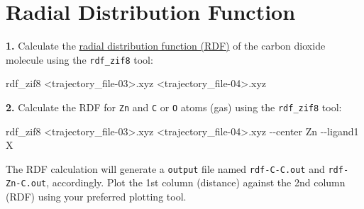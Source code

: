 \documentclass[
  letterpaper,
  DIV=11,
  numbers=noendperiod]{scrreprt}
\newenvironment{Shaded}{\begin{snugshade}}{\end{snugshade}}
\newcommand{\AttributeTok}[1]{\textcolor[rgb]{0.40,0.45,0.13}{#1}}
\newcommand{\ExtensionTok}[1]{\textcolor[rgb]{0.00,0.23,0.31}{#1}}
\newcommand{\NormalTok}[1]{\textcolor[rgb]{0.00,0.23,0.31}{#1}}
\newcommand{\OperatorTok}[1]{\textcolor[rgb]{0.37,0.37,0.37}{#1}}
\begin{document}
\hypertarget{radial-distribution-function}{%
\section*{Radial Distribution
Function}\label{radial-distribution-function}}


\textbf{1.} Calculate the
\protect\hyperlink{radial-distribution-functions-ux28rdfsux29}{radial
distribution function (RDF)} of the carbon dioxide molecule using the
\texttt{rdf\_zif8} tool:

\begin{Shaded}
\begin{Highlighting}[]
\ExtensionTok{rdf\_zif8} \OperatorTok{\textless{}}\NormalTok{trajectory\_file{-}03}\OperatorTok{\textgreater{}}\NormalTok{.xyz }\OperatorTok{\textless{}}\NormalTok{trajectory\_file{-}04}\OperatorTok{\textgreater{}}\NormalTok{.xyz}
\end{Highlighting}
\end{Shaded}

\textbf{2.} Calculate the RDF for \texttt{Zn} and \texttt{C} or
\texttt{O} atoms (gas) using the \texttt{rdf\_zif8} tool:

\begin{Shaded}
\begin{Highlighting}[]
\ExtensionTok{rdf\_zif8} \OperatorTok{\textless{}}\NormalTok{trajectory\_file{-}03}\OperatorTok{\textgreater{}}\NormalTok{.xyz }\OperatorTok{\textless{}}\NormalTok{trajectory\_file{-}04}\OperatorTok{\textgreater{}}\NormalTok{.xyz }\AttributeTok{{-}{-}center}\NormalTok{ Zn }\AttributeTok{{-}{-}ligand1}\NormalTok{ X}
\end{Highlighting}
\end{Shaded}

\begin{tcolorbox}[enhanced jigsaw, title=\textcolor{quarto-callout-note-color}{\faInfo}\hspace{0.5em}{Note}, colbacktitle=quarto-callout-note-color!10!white, bottomtitle=1mm, breakable, colframe=quarto-callout-note-color-frame, toprule=.15mm, opacitybacktitle=0.6, bottomrule=.15mm, titlerule=0mm, arc=.35mm, rightrule=.15mm, toptitle=1mm, coltitle=black, left=2mm, opacityback=0, colback=white, leftrule=.75mm]

The RDF calculation will generate a \texttt{output} file named
\texttt{rdf-C-C.out} and \texttt{rdf-Zn-C.out}, accordingly. Plot the
1st column (distance) against the 2nd column (RDF) using your preferred
plotting tool.

\end{tcolorbox}
\end{document}
